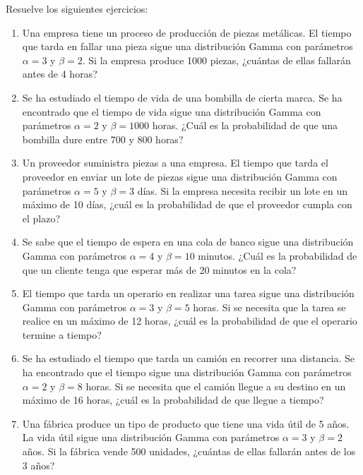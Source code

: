 \begin{Ejer}
Resuelve los siguientes ejercicios:
\begin{enumerate}

\item Una empresa tiene un proceso de producción de piezas metálicas. El tiempo que tarda en fallar una pieza sigue una distribución Gamma con parámetros $\alpha = 3$ y $\beta = 2$. Si la empresa produce 1000 piezas, ¿cuántas de ellas fallarán antes de 4 horas?

\item Se ha estudiado el tiempo de vida de una bombilla de cierta marca. Se ha encontrado que el tiempo de vida sigue una distribución Gamma con parámetros $\alpha = 2$ y $\beta = 1000$ horas. ¿Cuál es la probabilidad de que una bombilla dure entre 700 y 800 horas?

\item Un proveedor suministra piezas a una empresa. El tiempo que tarda el proveedor en enviar un lote de piezas sigue una distribución Gamma con parámetros $\alpha = 5$ y $\beta = 3$ días. Si la empresa necesita recibir un lote en un máximo de 10 días, ¿cuál es la probabilidad de que el proveedor cumpla con el plazo?

\item Se sabe que el tiempo de espera en una cola de banco sigue una distribución Gamma con parámetros $\alpha = 4$ y $\beta = 10$ minutos. ¿Cuál es la probabilidad de que un cliente tenga que esperar más de 20 minutos en la cola?

\item El tiempo que tarda un operario en realizar una tarea sigue una distribución Gamma con parámetros $\alpha = 3$ y $\beta = 5$ horas. Si se necesita que la tarea se realice en un máximo de 12 horas, ¿cuál es la probabilidad de que el operario termine a tiempo?

\item Se ha estudiado el tiempo que tarda un camión en recorrer una distancia. Se ha encontrado que el tiempo sigue una distribución Gamma con parámetros $\alpha = 2$ y $\beta = 8$ horas. Si se necesita que el camión llegue a su destino en un máximo de 16 horas, ¿cuál es la probabilidad de que llegue a tiempo?

\item Una fábrica produce un tipo de producto que tiene una vida útil de 5 años. La vida útil sigue una distribución Gamma con parámetros $\alpha = 3$ y $\beta = 2$ años. Si la fábrica vende 500 unidades, ¿cuántas de ellas fallarán antes de los 3 años?


\end{enumerate}
\end{Ejer}

